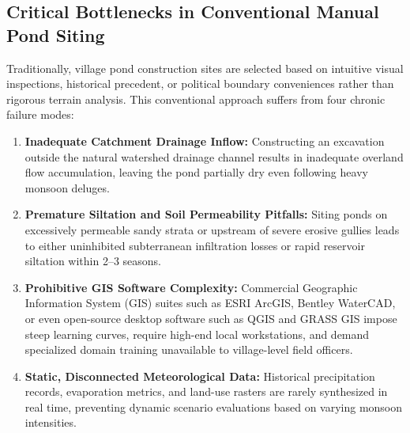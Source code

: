 \documentclass[11pt,a4paper]{article}
\begin{document}
\subsection{Critical Bottlenecks in Conventional Manual Pond Siting}
Traditionally, village pond construction sites are selected based on intuitive visual inspections, historical precedent, or political boundary conveniences rather than rigorous terrain analysis. This conventional approach suffers from four chronic failure modes:
\begin{enumerate}[noitemsep,topsep=2pt]
    \item \textbf{Inadequate Catchment Drainage Inflow:} Constructing an excavation outside the natural watershed drainage channel results in inadequate overland flow accumulation, leaving the pond partially dry even following heavy monsoon deluges.
    \item \textbf{Premature Siltation and Soil Permeability Pitfalls:} Siting ponds on excessively permeable sandy strata or upstream of severe erosive gullies leads to either uninhibited subterranean infiltration losses or rapid reservoir siltation within 2--3 seasons.
    \item \textbf{Prohibitive GIS Software Complexity:} Commercial Geographic Information System (GIS) suites such as ESRI ArcGIS, Bentley WaterCAD, or even open-source desktop software such as QGIS and GRASS GIS impose steep learning curves, require high-end local workstations, and demand specialized domain training unavailable to village-level field officers.
    \item \textbf{Static, Disconnected Meteorological Data:} Historical precipitation records, evaporation metrics, and land-use rasters are rarely synthesized in real time, preventing dynamic scenario evaluations based on varying monsoon intensities.
\end{enumerate}
\end{document}
